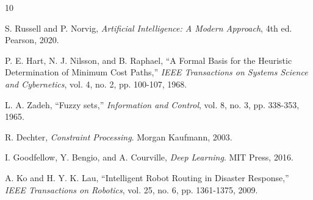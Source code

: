 \documentclass[conference]{IEEEtran}
\begin{document}
\balance
\begin{thebibliography}{10}

S. Russell and P. Norvig, \emph{Artificial Intelligence: A Modern Approach}, 4th ed. Pearson, 2020.

P. E. Hart, N. J. Nilsson, and B. Raphael, ``A Formal Basis for the Heuristic Determination of Minimum Cost Paths,'' \emph{IEEE Transactions on Systems Science and Cybernetics}, vol. 4, no. 2, pp. 100-107, 1968.

L. A. Zadeh, ``Fuzzy sets,'' \emph{Information and Control}, vol. 8, no. 3, pp. 338-353, 1965.

R. Dechter, \emph{Constraint Processing}. Morgan Kaufmann, 2003.

I. Goodfellow, Y. Bengio, and A. Courville, \emph{Deep Learning}. MIT Press, 2016.

A. Ko and H. Y. K. Lau, ``Intelligent Robot Routing in Disaster Response,'' \emph{IEEE Transactions on Robotics}, vol. 25, no. 6, pp. 1361-1375, 2009.

\end{thebibliography}
\end{document}
